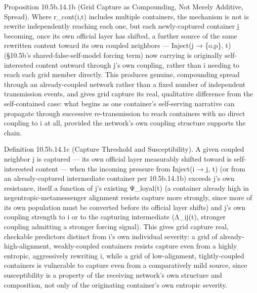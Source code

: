 \documentclass[
]{article}
\begin{document}
Proposition 10.5b.14.1b (Grid Capture as Compounding, Not Merely
Additive, Spread). Where r\_cont(i,t) includes multiple containers, the
mechanism is not is rewrite independently reaching each one, but each
newly-captured container j becoming, once its own official layer has
shifted, a further source of the same rewritten content toward its own
coupled neighbors --- Inject(j → \{o,p\}, t) (§10.5b's
shared-false-self-model forcing term) now carrying is originally
self-interested content outward through j's own coupling, rather than i
needing to reach each grid member directly. This produces genuine,
compounding spread through an already-coupled network rather than a
fixed number of independent transmission events, and gives grid capture
its real, qualitative difference from the self-contained case: what
begins as one container's self-serving narrative can propagate through
successive re-transmission to reach containers with no direct coupling
to i at all, provided the network's own coupling structure supports the
chain.

Definition 10.5b.14.1c (Capture Threshold and Susceptibility). A given
coupled neighbor j is captured --- its own official layer measurably
shifted toward is self-interested content --- when the incoming pressure
from Inject(i → j, t) (or from an already-captured intermediate
container per 10.5b.14.1b) exceeds j's own resistance, itself a function
of j's existing Ψ\_loyal(t) (a container already high in
negentropic-metamessenger alignment resists capture more strongly, since
more of its own population must be converted before its official layer
shifts) and j's own coupling strength to i or to the capturing
intermediate (Λ\_ij(t), stronger coupling admitting a stronger forcing
signal). This gives grid capture real, checkable predictors distinct
from i's own individual severity: a grid of already-high-alignment,
weakly-coupled containers resists capture even from a highly entropic,
aggressively rewriting i, while a grid of low-alignment, tightly-coupled
containers is vulnerable to capture even from a comparatively mild
source, since susceptibility is a property of the receiving network's
own structure and composition, not only of the originating container's
own entropic severity.
\end{document}
